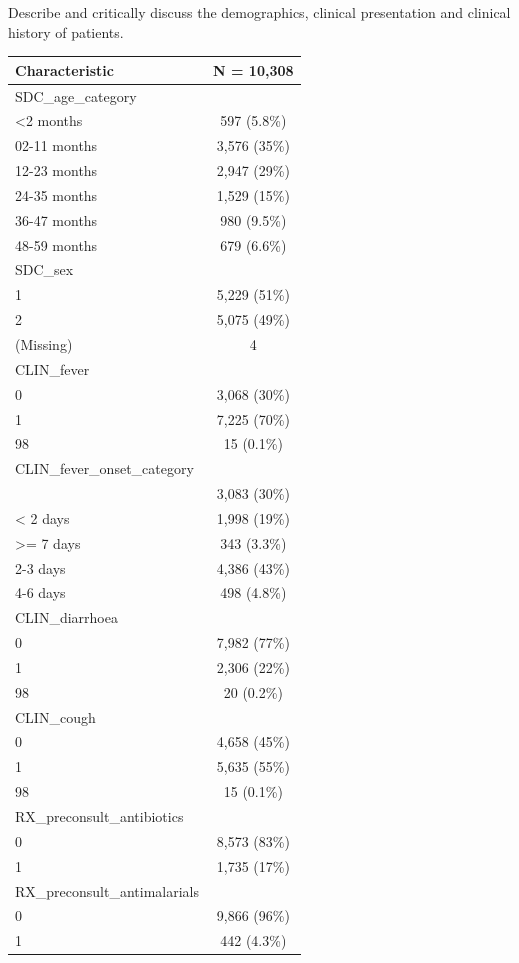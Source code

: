 \documentclass[
  letterpaper,
  DIV=11,
  numbers=noendperiod,
  oneside]{scrreprt}
\begin{document}
Describe and critically discuss the demographics, clinical presentation
and clinical history of patients.

\begin{longtable}[]{@{}lc@{}}
\toprule\noalign{}
\textbf{Characteristic} & \textbf{N = 10,308} \\
\midrule\noalign{}
\endhead
\bottomrule\noalign{}
\endlastfoot
SDC\_age\_category & \\
\textless2 months & 597 (5.8\%) \\
02-11 months & 3,576 (35\%) \\
12-23 months & 2,947 (29\%) \\
24-35 months & 1,529 (15\%) \\
36-47 months & 980 (9.5\%) \\
48-59 months & 679 (6.6\%) \\
SDC\_sex & \\
1 & 5,229 (51\%) \\
2 & 5,075 (49\%) \\
(Missing) & 4 \\
CLIN\_fever & \\
0 & 3,068 (30\%) \\
1 & 7,225 (70\%) \\
98 & 15 (0.1\%) \\
CLIN\_fever\_onset\_category & \\
& 3,083 (30\%) \\
\textless{} 2 days & 1,998 (19\%) \\
\textgreater= 7 days & 343 (3.3\%) \\
2-3 days & 4,386 (43\%) \\
4-6 days & 498 (4.8\%) \\
CLIN\_diarrhoea & \\
0 & 7,982 (77\%) \\
1 & 2,306 (22\%) \\
98 & 20 (0.2\%) \\
CLIN\_cough & \\
0 & 4,658 (45\%) \\
1 & 5,635 (55\%) \\
98 & 15 (0.1\%) \\
RX\_preconsult\_antibiotics & \\
0 & 8,573 (83\%) \\
1 & 1,735 (17\%) \\
RX\_preconsult\_antimalarials & \\
0 & 9,866 (96\%) \\
1 & 442 (4.3\%) \\
\end{longtable}
\end{document}
